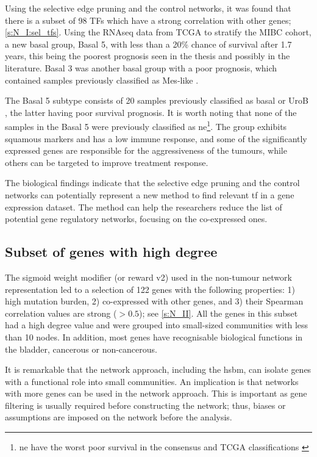 Using the selective edge pruning and the control networks, it was found that there is a subset of 98 TFs which have a strong correlation with other genes; \cref{s:N_I:sel_tfs}. Using the RNAseq data from TCGA to stratify the MIBC cohort, a new basal group, Basal 5, with less than a 20\% chance of survival after 1.7 years, this being the poorest prognosis seen in the thesis and possibly in the literature. Basal 3 was another basal group with a poor prognosis, which contained samples previously classified as Mes-like \citep{Marzouka2018-ge}.

The Basal 5 subtype consists of 20 samples previously classified as basal \citep{Kamoun2020-tj,Robertson2017-mg} or UroB \citep{Marzouka2018-ge}, the latter having poor survival prognosis. It is worth noting that none of the samples in the Basal 5 were previously classified as \acrlong{ne}\footnote{\acrlong{ne} have the worst poor survival in the consensus and TCGA classifications \citep{Kamoun2020-tj,Robertson2017-mg}}. The group exhibits squamous markers and has a low immune response, and some of the significantly expressed genes are responsible for the aggressiveness of the tumours, while others can be targeted to improve treatment response.

The biological findings indicate that the selective edge pruning and the control networks can potentially represent a new method to find relevant \acrfull{tf} in a gene expression dataset. The method can help the researchers reduce the list of potential gene regulatory networks, focusing on the co-expressed ones.

\subsection*{Subset of genes with high degree}

The sigmoid weight modifier (or reward v2) used in the non-tumour network representation led to a selection of 122 genes with the following properties: 1) high mutation burden, 2) co-expressed with other genes, and 3) their Spearman correlation values are strong (\(>0.5\)); see \cref{s:N_II}. All the genes in this subset had a high degree value and were grouped into small-sized communities with less than 10 nodes. In addition, most genes have recognisable biological functions in the bladder, cancerous or non-cancerous.

It is remarkable that the network approach, including the \acrshort{hsbm}, can isolate genes with a functional role into small communities. An implication is that networks with more genes can be used in the network approach. This is important as gene filtering is usually required before constructing the network; thus, biases or assumptions are imposed on the network before the analysis.

